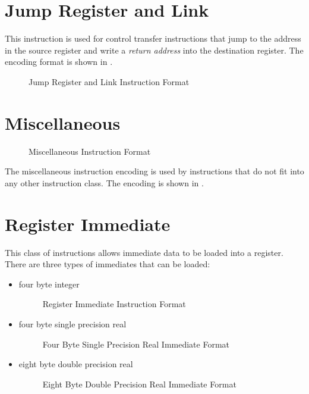 \section{Jump Register and Link}

This instruction is used for control transfer instructions that jump
to the address in the source register and write a \emph{return
  address} into the destination register.  The encoding format is
shown in .

\begin{figure}[h!]
  \centering
  \jralbox\usebox{\jraltypebox}
    \caption{Jump Register and Link Instruction Format}
    \label{fig:jump-register-and-link-format}
\end{figure}


\section{Miscellaneous}

\begin{figure}[h]
  \centering
{}\usebox{\mtypebox}
    \caption{Miscellaneous Instruction Format}
    \label{fig:misc-format}
\end{figure}

The miscellaneous instruction encoding is used by instructions that do
not fit into any other instruction class.  The encoding is shown in
.


\section{Register Immediate}


This class of instructions allows immediate data to be loaded into a
register.  There are three types of immediates that can be loaded:

\begin{itemize}
\item four byte integer
  \begin{figure}[h!]
    \centering
      \usebox{\regmemtypebox}
      \caption{Register Immediate Instruction Format}
  \end{figure}

\item four byte single precision real

  \begin{figure}[h!]
    \centering
      \usebox{\regmemimmfloattypebox}
      \caption{Four Byte Single Precision Real Immediate Format}
      \label{fig:four-byte-float-format}
  \end{figure}

\item eight byte double precision real
  \begin{figure}[h!]
    \centering
      \usebox{\regmemimmdoubletypebox}
      \caption{Eight Byte Double Precision Real Immediate Format}
      \label{fig:eight-byte-float-format}
  \end{figure}
\end{itemize}

